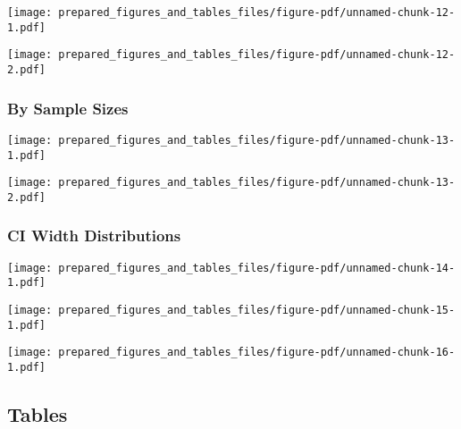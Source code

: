 \documentclass[
]{article}
\begin{document}
\texttt{[image: prepared\_figures\_and\_tables\_files/figure-pdf/unnamed-chunk-12-1.pdf]}

\texttt{[image: prepared\_figures\_and\_tables\_files/figure-pdf/unnamed-chunk-12-2.pdf]}

\hypertarget{by-sample-sizes}{%
\subsubsection{By Sample Sizes}\label{by-sample-sizes}}

\texttt{[image: prepared\_figures\_and\_tables\_files/figure-pdf/unnamed-chunk-13-1.pdf]}

\texttt{[image: prepared\_figures\_and\_tables\_files/figure-pdf/unnamed-chunk-13-2.pdf]}

\hypertarget{ci-width-distributions}{%
\subsubsection{CI Width Distributions}\label{ci-width-distributions}}

\texttt{[image: prepared\_figures\_and\_tables\_files/figure-pdf/unnamed-chunk-14-1.pdf]}

\texttt{[image: prepared\_figures\_and\_tables\_files/figure-pdf/unnamed-chunk-15-1.pdf]}

\texttt{[image: prepared\_figures\_and\_tables\_files/figure-pdf/unnamed-chunk-16-1.pdf]}

\hypertarget{tables}{%
\subsection{Tables}\label{tables}}
\end{document}
